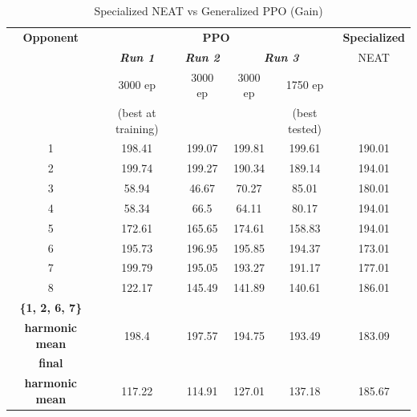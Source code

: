 \documentclass[conference]{IEEEtran}
\begin{document}
    \begin{table}[htbp]
        \caption{Specialized NEAT vs Generalized PPO (Gain)}
        \begin{center}
            \begin{tabular}{|c|c|c|c|c|c|}
                \hline
                \textbf{Opponent} & \multicolumn{4}{|c|}{\textbf{PPO}} & \textbf{Specialized} \\
                \cline{2-5}
                & \textbf{\textit{Run 1}} & \textbf{\textit{Run 2}} & \multicolumn{2}{|c|}{\textbf{\textit{Run 3}}} & NEAT \\
                \cline{4-5}
                & 3000 ep            & 3000 ep & 3000 ep & 1750 ep       &        \\
                & (best at training) &         &         & (best tested) &        \\
                \hline
                1                       & 198.41             & 199.07  & 199.81  & 199.61        & 190.01 \\
                2                       & 199.74             & 199.27  & 190.34  & 189.14        & 194.01 \\
                3                       & 58.94              & 46.67   & 70.27   & 85.01         & 180.01 \\
                4                       & 58.34              & 66.5    & 64.11   & 80.17         & 194.01 \\
                5                       & 172.61             & 165.65  & 174.61  & 158.83        & 194.01 \\
                6                       & 195.73             & 196.95  & 195.85  & 194.37        & 173.01 \\
                7                       & 199.79             & 195.05  & 193.27  & 191.17        & 177.01 \\
                8                       & 122.17             & 145.49  & 141.89  & 140.61        & 186.01 \\
                \hline
                \textbf{\{1, 2, 6, 7\}} &                    &         &         &               &        \\
                \textbf{harmonic mean}  & 198.4              & 197.57  & 194.75  & 193.49        & 183.09 \\
                \hline
                \textbf{final}          &                    &         &         &               &        \\
                \textbf{harmonic mean}  & 117.22             & 114.91  & 127.01  & 137.18        & 185.67 \\
                \hline

            \end{tabular}
            \label{tab1}
        \end{center}
    \end{table}
\end{document}
